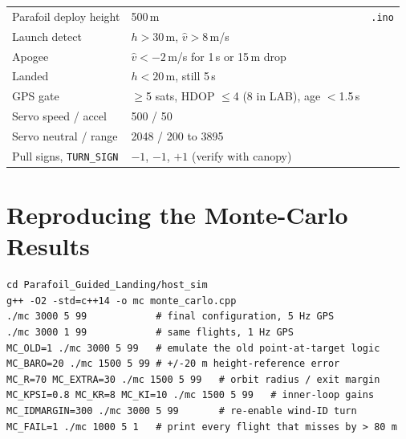 \documentclass[11pt,a4paper]{article}
\newcommand{\code}[1]{\texttt{#1}}
\begin{document}
\begin{center}
\begin{longtable}{lll}
\midrule
Parafoil deploy height & 500\,m & \code{.ino} \\
Launch detect & $h > 30$\,m, $\hat v > 8$\,m/s & \\
Apogee & $\hat v < -2$\,m/s for 1\,s or 15\,m drop & \\
Landed & $h < 20$\,m, still 5\,s & \\
GPS gate & $\ge$5 sats, HDOP $\le$4 (8 in LAB), age $<$1.5\,s & \\
Servo speed / accel & 500 / 50 & \\
Servo neutral / range & 2048 / 200 to 3895 & \\
Pull signs, \code{TURN\_SIGN} & $-1$, $-1$, $+1$ (verify with canopy) & \\
\bottomrule
\end{longtable}
\end{center}

\section{Reproducing the Monte-Carlo Results}
\begin{verbatim}
cd Parafoil_Guided_Landing/host_sim
g++ -O2 -std=c++14 -o mc monte_carlo.cpp
./mc 3000 5 99            # final configuration, 5 Hz GPS
./mc 3000 1 99            # same flights, 1 Hz GPS
MC_OLD=1 ./mc 3000 5 99   # emulate the old point-at-target logic
MC_BARO=20 ./mc 1500 5 99 # +/-20 m height-reference error
MC_R=70 MC_EXTRA=30 ./mc 1500 5 99   # orbit radius / exit margin
MC_KPSI=0.8 MC_KR=8 MC_KI=10 ./mc 1500 5 99   # inner-loop gains
MC_IDMARGIN=300 ./mc 3000 5 99       # re-enable wind-ID turn
MC_FAIL=1 ./mc 1000 5 1   # print every flight that misses by > 80 m
\end{verbatim}
\end{document}
